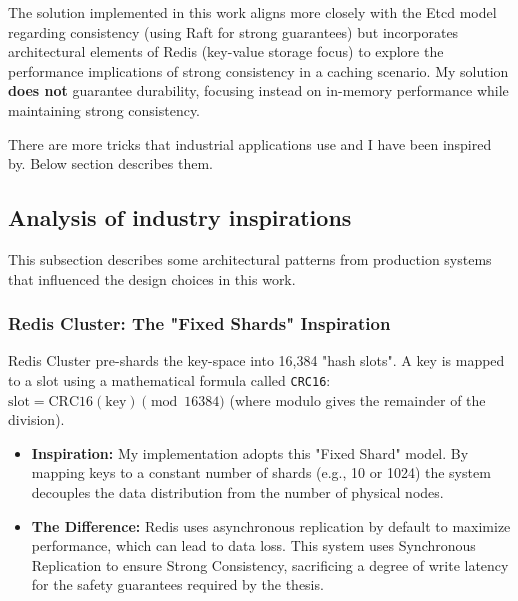 \documentclass[shortabstract]{iithesis}
\begin{document}
\noindent The solution implemented in this work aligns more closely with the Etcd model regarding consistency (using Raft for strong guarantees) but incorporates architectural elements of Redis (key-value storage focus) to explore the performance implications of strong consistency in a caching scenario. My solution \textbf{does not} guarantee durability, focusing instead on in-memory performance while maintaining strong consistency.

There are more tricks that industrial applications use and I have been inspired by. Below section describes them.

\subsection{Analysis of industry inspirations}
This subsection describes some architectural patterns from production systems that influenced the design choices in this work. 

\subsubsection{Redis Cluster: The "Fixed Shards" Inspiration}
Redis Cluster pre-shards the key-space into 16,384 "hash slots". A key is mapped to a slot using a mathematical formula called \texttt{CRC16}: $\text{slot} = \text{CRC16}(\text{key}) \pmod{16384}$ (where modulo gives the remainder of the division).
\begin{itemize}
    \item \textbf{Inspiration:} My implementation adopts this "Fixed Shard" model. By mapping keys to a constant number of shards (e.g., 10 or 1024) the system decouples the data distribution from the number of physical nodes. 
    \item \textbf{The Difference:} Redis uses asynchronous replication by default to maximize performance, which can lead to data loss. This system uses Synchronous Replication to ensure Strong Consistency, sacrificing a degree of write latency for the safety guarantees required by the thesis.
\end{itemize}
\end{document}
